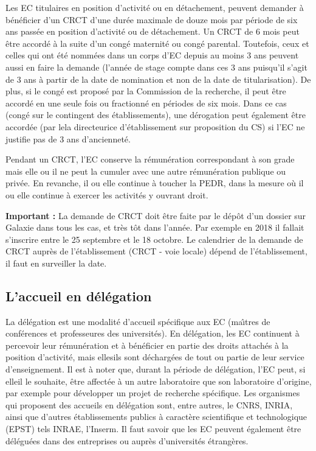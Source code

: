 Les EC titulaires en position d'activit\'e ou en d\'etachement,
peuvent demander \`a b\'en\'eficier d'un CRCT d'une dur\'ee maximale
de douze mois par p\'eriode de six ans pass\'ee en position
d'activit\'e ou de d\'etachement. Un CRCT de 6 mois peut \^etre accord\'e
\`a la suite d'un cong\'e maternit\'e ou cong\'e parental.
Toutefois, ceux et celles qui ont \'et\'e
nomm\'e\mp e\mp s dans un corps d'EC depuis au moins 3 ans peuvent aussi
en faire la demande (l'ann\'ee de stage compte dans ces 3 ans
puisqu'il s'agit de 3 ans \`a partir de la date de nomination et
non de la date de titularisation). De plus, si le cong\'e est
propos\'e par la Commission de la recherche, il peut \^etre accord\'e en
une seule fois ou fractionn\'e en p\'eriodes de six mois.
 Dans ce cas (cong\'e sur le contingent des
\'etablissements), une d\'erogation peut \'egalement \^etre accord\'ee
(par le\mp la directeur\mp ice d'\'etablissement sur proposition
du CS) si l'EC ne justifie pas de 3 ans d'anciennet\'e.

Pendant un CRCT, l'EC conserve la r\'emun\'eration correspondant \`a son grade
mais elle ou il ne peut la cumuler avec une autre r\'emun\'eration publique ou priv\'ee.
En revanche, il ou elle continue \`a toucher la PEDR, dans la mesure o\`u il ou elle continue \`a exercer les activit\'es y ouvrant droit. 


\textbf{Important :} La demande de CRCT doit \^etre faite par le d\'ep\^ot d’un dossier sur Galaxie dans tous les cas, et tr\`es t\^ot dans l'ann\'ee. Par exemple en 2018 il fallait s'inscrire entre le 25 septembre et le 18 octobre. Le calendrier de la demande de CRCT aupr\`es de l’\'etablissement (CRCT - voie locale) d\'epend de l'\'etablissement, il faut en surveiller la date.

\subsection{L'accueil en d\'el\'egation}
\label{delegation}


La d\'el\'egation est une modalit\'e d'accueil sp\'ecifique aux
EC  (ma\^\i tres de conf\'erences et
professeur\mp e\mp s des universit\'es). En d\'el\'egation, les
EC continuent \`a percevoir leur r\'emun\'eration
et \`a b\'en\'eficier en partie des droits attach\'es \`a la position
d'activit\'e, mais elles\mp ils
sont d\'echarg\'e\mp e\mp s de tout ou partie de leur service d'enseignement.
Il est \`a noter que, durant la p\'eriode de d\'el\'egation, l'EC peut,
si elle\mp il le souhaite, \^etre affect\'e\mp e \`a un autre laboratoire
que son laboratoire d'origine, par exemple pour d\'evelopper
un projet de recherche sp\'ecifique.
Les organismes qui
proposent des accueils en d\'el\'egation sont, entre autres, le
CNRS, INRIA, ainsi que d'autres \'etablis\-se\-ments publics \`a
caract\`ere scientifique et technologique (EPST) tels INRAE,
l'Inserm. Il faut savoir que les EC peuvent
\'egalement \^etre d\'el\'egu\'e\mp e\mp s dans des entreprises ou aupr\`es
d'universit\'es \'etrang\`eres.

